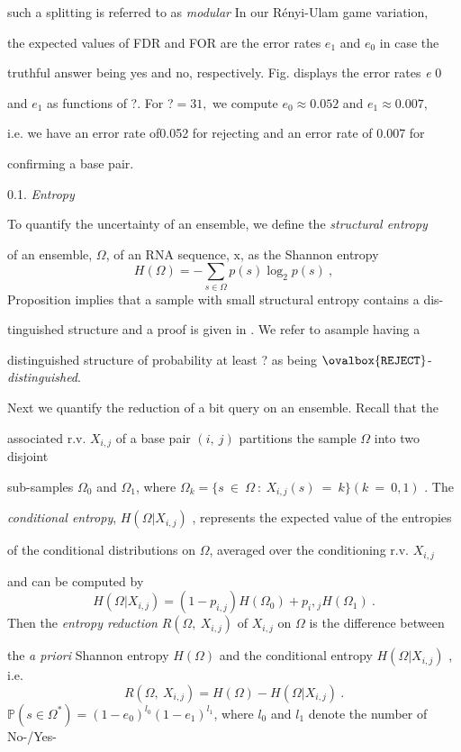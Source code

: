 \documentclass[a4paper,12pt]{article}
\begin{document}
such a splitting is referred to as {\it modular} In our Rényi-Ulam game variation,

the expected values of FDR and FOR are the error rates $e_{1}$ and $e_{0}$ in case the

truthful answer being yes and no, respectively. Fig. displays the error rates {\it e} $0$

and $e_{1}$ as functions of ?. For ?$= 31,$ we compute $e_{0} \approx 0.052$ and $e_{1} \approx 0.007,$

i.e. we have an error rate of0.052 for rejecting and an error rate of 0.007 for

confirming a base pair.

0.1. {\it Entropy}

To quantify the uncertainty of an ensemble, we define the {\it structural entropy}

of an ensemble, $\Omega$, of an RNA sequence, $\mathrm{x}$, as the Shannon entropy
$$
H(\Omega)=-\sum_{s\in\Omega}p(s)\log_{2}p(s)\ ,
$$
Proposition implies that a sample with small structural entropy contains a dis-

tinguished structure and a proof is given in . We refer to asample having a

distinguished structure of probability at least ? as being $\ovalbox{\tt\small REJECT}$-{\it distinguished}.

Next we quantify the reduction of a bit query on an ensemble. Recall that the

associated r.v. $X_{i,j}$ of a base pair $(i,\ j)$ partitions the sample $\Omega$ into two disjoint

sub-samples $\Omega_{0}$ and $\Omega_{1}$, where $\Omega_{k} = \{s\ \in\ \Omega\ :\ X_{i,j}(s)\ =\ k\} (k\ =\ 0,1)$ . The

{\it conditional entropy}, $H(\Omega|X_{i,j})$ , represents the expected value of the entropies

of the conditional distributions on $\Omega$, averaged over the conditioning r.v. $X_{i,j}$

and can be computed by
$$
H(\Omega|X_{i,j})=(1-p_{i,j})H(\Omega_{0})+p_{i},{}_{j}H(\Omega_{1})\ .
$$
Then the {\it entropy reduction} $R(\Omega,\ X_{i,j})$ of $X_{i,j}$ on $\Omega$ is the difference between

the {\it a priori} Shannon entropy $H(\Omega)$ and the conditional entropy $H(\Omega|X_{i,j})$ , i.e.
$$
R(\Omega,\ X_{i,j})=H(\Omega)-H(\Omega|X_{i,j})\ .
$$
$\mathbb{P}(s\in\Omega^{*})=(1-e_{0})^{l_{0}}(1-e_{1})^{l_{1}}$, where $l_{0}$ and $l_{1}$ denote the number of No-/Yes-
\end{document}
